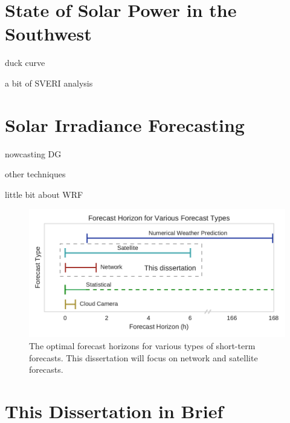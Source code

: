 \section{State of Solar Power in the Southwest}
duck curve

a bit of SVERI analysis

\section{Solar Irradiance Forecasting}
nowcasting DG

other techniques

little bit about WRF

\begin{figure}[h]
\includegraphics[width=\textwidth]{figs/fxhoriz.pdf}
\caption[Forecast horizon for various forecast types]{The optimal
  forecast horizons for various types of short-term forecasts. This
  dissertation will focus on network and satellite forecasts.}
\label{fig:fxhoriz}
\end{figure}


\section{This Dissertation in Brief}

